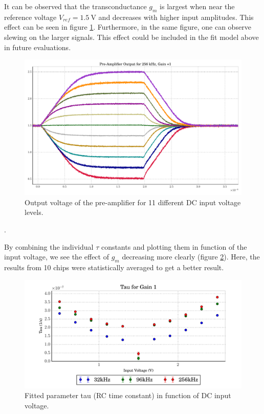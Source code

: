 It can be observed that the transconductance $g_m$ is largest  when  near  the
reference  voltage $V_{ref}=\SI{1.5}{\volt}$ and decreases with  higher  input
amplitudes. This effect  can  be  seen  in figure \ref{fig:preamp_11_signals}.
Furthermore, in the  same  figure,  one  can  observe  slewing  on  the larger
signals.  This  effect  could  be included in the fit model  above  in  future
evaluations.

\begin{figure}
    \centering
    \includegraphics[width=.85\linewidth]{images/plots/vinComparisonPreamp.pdf}
    \caption{Output voltage of the pre-amplifier for 11 different DC input voltage levels.}
    \label{fig:preamp_11_signals}
\end{figure}
. 

By combining the individual $\tau$ constants and  plotting them in function of
the input voltage, we see the  effect of $g_m$ decreasing more clearly (figure
\ref{fig:tau}).  Here,  the  results from 10 chips were statistically averaged to get a better result.

\begin{figure}
    \centering
    \includegraphics[width=.85\linewidth]{images/plots/tau_results_1.pdf}
    \caption{Fitted parameter tau (RC time constant) in function of DC input voltage.}
    \label{fig:tau}
\end{figure}

